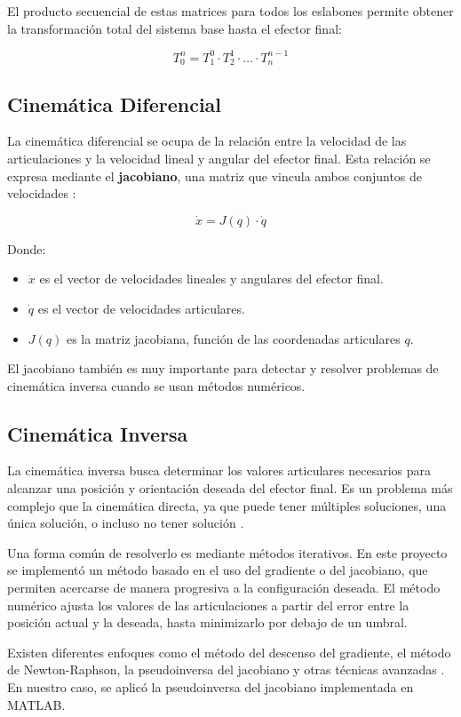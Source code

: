 El producto secuencial de estas matrices para todos los eslabones permite obtener la transformación total del sistema base hasta el efector final:

\[
T_0^n = T_1^0 \cdot T_2^1 \cdot \ldots \cdot T_n^{n-1}
\]

\subsection{Cinemática Diferencial}

La cinemática diferencial se ocupa de la relación entre la velocidad de las articulaciones y la velocidad lineal y angular del efector final. Esta relación se expresa mediante el \textbf{jacobiano}, una matriz que vincula ambos conjuntos de velocidades \cite{siciliano2010robotics}:

\[
\dot{x} = J(q) \cdot \dot{q}
\]

Donde:
\begin{itemize}
	\item \( \dot{x} \) es el vector de velocidades lineales y angulares del efector final.
	\item \( \dot{q} \) es el vector de velocidades articulares.
	\item \( J(q) \) es la matriz jacobiana, función de las coordenadas articulares \( q \).
\end{itemize}

El jacobiano también es muy importante para detectar y  resolver problemas de cinemática inversa cuando se usan métodos numéricos.

\subsection{Cinemática Inversa}

La cinemática inversa busca determinar los valores articulares necesarios para alcanzar una posición y orientación deseada del efector final. Es un problema más complejo que la cinemática directa, ya que puede tener múltiples soluciones, una única solución, o incluso no tener solución \cite{saha2010}.

Una forma común de resolverlo es mediante métodos iterativos. En este proyecto se implementó un método basado en el uso del gradiente o del jacobiano, que permiten acercarse de manera progresiva a la configuración deseada. El método numérico ajusta los valores de las articulaciones a partir del error entre la posición actual y la deseada, hasta minimizarlo por debajo de un umbral.

Existen diferentes enfoques como el método del descenso del gradiente, el método de Newton-Raphson, la pseudoinversa del jacobiano y otras técnicas avanzadas \cite{siciliano2010robotics}. En nuestro caso, se aplicó la pseudoinversa del jacobiano implementada en MATLAB.
